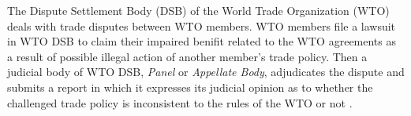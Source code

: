 The Dispute Settlement Body (DSB) of 
the World Trade Organization (WTO) deals 
with trade disputes between WTO members.
WTO members file a lawsuit in WTO DSB to 
claim their impaired benifit related to the WTO agreements as a result of possible illegal action of another member's trade policy.
Then a judicial body of WTO DSB, \textit{Panel} or \textit{Appellate Body}, %
adjudicates the dispute and submits a report in which it expresses
its judicial opinion as to whether the challenged 
trade policy is inconsistent to the rules of the WTO or not \citep{world2017handbook}.

 

